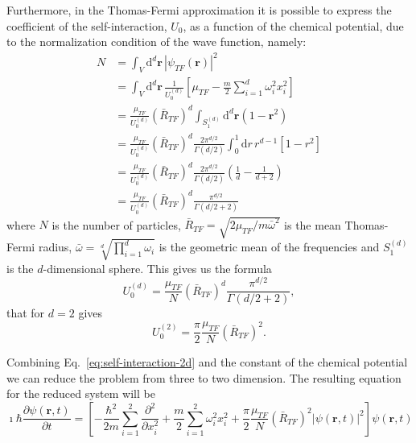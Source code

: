 Furthermore, in the Thomas-Fermi approximation it is possible to express the coefficient of the self-interaction, $U_0$, as a function of the chemical potential, due to the normalization condition of the wave function, namely:
\begin{equation}
\begin{split}
N & = \int_V \mathrm{d}^d \textbf{r} \, |\psi_{TF}(\textbf{r})|^2 \\
& = \int_V \mathrm{d}^d \textbf{r} \, \frac{1}{U_0^{(d)}} \left[ \mu_{TF} - \frac{m}{2} \sum_{i=1}^d \omega_i^2 x_i^2 \right] \\
& = \frac{\mu_{TF}}{U_0^{(d)}} \left( \bar{R}_{TF} \right)^d \int_{S_1^{(d)}} \mathrm{d}^d \textbf{r} (1 - \textbf{r}^2) \\ 
& = \frac{\mu_{TF}}{U_0^{(d)}} \left( \bar{R}_{TF} \right)^d \frac{2\pi^{d/2}}{\Gamma(d/2)} \int_0^1 \mathrm{d}r \, r^{d-1} [1 - r^2] \\
& = \frac{\mu_{TF}}{U_0^{(d)}} \left( \bar{R}_{TF} \right)^d \frac{2\pi^{d/2}}{\Gamma(d/2)} \left( \frac{1}{d} - \frac{1}{d+2} \right) \\
& = \frac{\mu_{TF}}{U_0^{(d)}} \left( \bar{R}_{TF} \right)^d \frac{\pi^{d/2}}{\Gamma(d/2 + 2)}
\end{split}
\end{equation}
where $N$ is the number of particles, $\bar{R}_{TF} = \sqrt{2\mu_{TF} / m \bar{\omega}^2}$ is the mean Thomas-Fermi radius, $\bar{\omega} = \sqrt[d]{\prod_{i=1}^d \omega_i}$ is the geometric mean of the frequencies and $S_1^{(d)}$ is the $d$-dimensional sphere.
This gives us the formula
\begin{equation}
U_0^{(d)} = \frac{\mu_{TF}}{N} \left( \bar{R}_{TF} \right)^d \frac{\pi^{d/2}}{\Gamma(d/2 + 2)},
\end{equation}
that for $d=2$ gives
\begin{equation} \label{eq:self-interaction-2d}
U_0^{(2)} = \frac{\pi}{2} \frac{\mu_{TF}}{N} \left( \bar{R}_{TF} \right)^2.
\end{equation}

Combining Eq.~\eqref{eq:self-interaction-2d} and the constant of the chemical potential we can reduce the problem from three to two dimension. The resulting equation for the reduced system will be
\begin{equation}
\imath \hbar \frac{\partial \psi(\textbf{r}, t)}{\partial t} = \left[ - \frac{\hbar^2}{2m} \sum_{i=1}^2 \frac{\partial^2}{\partial x_i^2} + \frac{m}{2} \sum_{i=1}^2 \omega_i^2 x_i^2 + \frac{\pi}{2} \frac{\mu_{TF}}{N} \left( \bar{R}_{TF} \right)^2 |\psi(\textbf{r}, t)|^2 \right] \psi(\textbf{r}, t)
\end{equation}